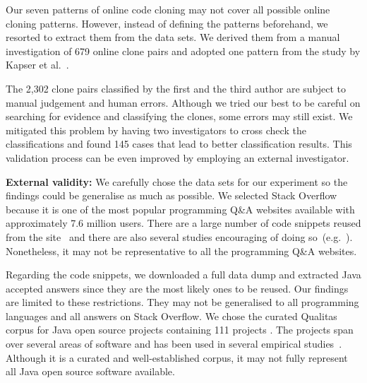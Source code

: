\documentclass[10pt,journal,compsoc]{IEEEtran}
\begin{document}


Our seven patterns of online code cloning may not cover all possible online
cloning patterns. However, instead of defining the patterns beforehand, we
resorted to extract them from the data sets. We derived them from a manual
investigation of 679 online clone pairs and adopted one pattern from the study
by Kapser et al.~\cite{Kapser2003}.

The 2,302 clone pairs classified by the first and the third author are subject
to manual judgement and human errors.  Although we tried our best to be careful
on searching for evidence and classifying the clones, some errors may still
exist. We mitigated this problem by having two investigators to cross check the
classifications and found 145 cases that lead to better classification results.
This validation process can be even improved by employing an external
investigator. 


\textbf{External validity:} We carefully chose the data sets for our
experiment so the findings could be generalise as much as possible.
We selected Stack Overflow because it is one of the most popular
programming Q\&A websites available with approximately 7.6 million
users. There are a large number of code snippets reused from the
site~\cite{An2017} and there are also several studies encouraging of
doing
so~(e.g.~\cite{Ponzanelli2013,Ponzanelli2014,Keivanloo2014,Park2014}).
Nonetheless, it may not be representative to all the programming Q\&A
websites.

Regarding the code snippets, we downloaded a full data dump and
extracted Java accepted answers
since they are the
most likely ones to be reused. 
Our findings are limited to these restrictions. They may
not be generalised to all programming languages and all answers on
Stack Overflow. We chose the curated Qualitas
corpus for Java open source projects containing 111 projects
\cite{QualitasCorpus}.  The projects span over several areas of
software and has been used in several empirical
studies~\cite{Taube-Schock2011,Beckman2011,Vasilescu2011,Omar2012}. Although
it is a curated and well-established corpus, it may not fully
represent all Java open source software available.
\end{document}
